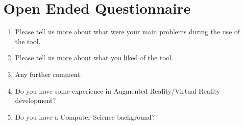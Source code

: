 \section{Open Ended Questionnaire}
\label{appendix:openended}
\begin{enumerate}
    \item Please tell us more about what were your main problems during the use of the tool.
    \item Please tell us more about what you liked of the tool.
    \item Any further comment.
    \item Do you have some experience in Augmented Reality/Virtual Reality development?
    \item Do you have a Computer Science background?
\end{enumerate}


